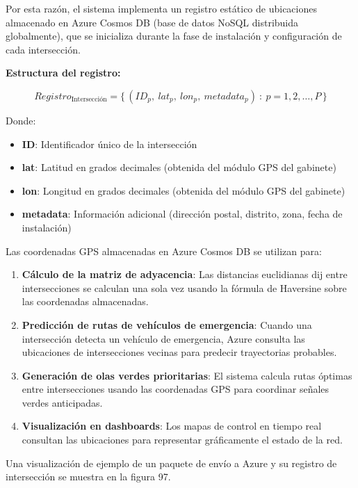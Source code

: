 \documentclass[12pt,a4paper,oneside]{report}
\begin{document}
Por esta razón, el sistema implementa un registro estático de ubicaciones almacenado en Azure Cosmos DB (base de datos NoSQL distribuida globalmente), que se inicializa durante la fase de instalación y configuración de cada intersección.

\textbf{Estructura del registro:}

\begin{equation}
Registro_{\text{Intersección}} = \{\,(ID_{p},\ lat_{p},\ lon_{p},\ metadata_{p})\ :\ p = 1, 2, \ldots, P\,\}
\label{eq:registro}
\end{equation}

Donde:

\begin{itemize}
\item
  \textbf{ID}: Identificador único de la intersección
\item
  \textbf{lat}: Latitud en grados decimales (obtenida del módulo GPS del gabinete)
\item
  \textbf{lon}: Longitud en grados decimales (obtenida del módulo GPS del gabinete)
\item
  \textbf{metadata}: Información adicional (dirección postal, distrito, zona, fecha de instalación)
\end{itemize}

Las coordenadas GPS almacenadas en Azure Cosmos DB se utilizan para:

\begin{enumerate}
\def\labelenumi{\arabic{enumi}.}
\item
  \textbf{Cálculo de la matriz de adyacencia}: Las distancias euclidianas dij entre intersecciones se calculan una sola vez usando la fórmula de Haversine sobre las coordenadas almacenadas.
\item
  \textbf{Predicción de rutas de vehículos de emergencia}: Cuando una intersección detecta un vehículo de emergencia, Azure consulta las ubicaciones de intersecciones vecinas para predecir trayectorias probables.
\item
  \textbf{Generación de olas verdes prioritarias}: El sistema calcula rutas óptimas entre intersecciones usando las coordenadas GPS para coordinar señales verdes anticipadas.
\item
  \textbf{Visualización en dashboards}: Los mapas de control en tiempo real consultan las ubicaciones para representar gráficamente el estado de la red.
\end{enumerate}

Una visualización de ejemplo de un paquete de envío a Azure y su registro de intersección se muestra en la figura 97.
\end{document}
